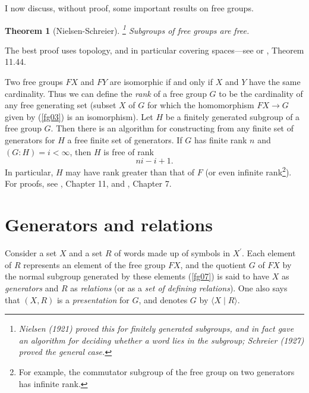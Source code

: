 \documentclass[a4paper,11pt,final,openany]{memoir}%
\newtheorem{theorem}[X]{Theorem}
\theoremstyle{nonumberplain}
\begin{document}
I now discuss, without proof, some important results on free groups.

\begin{theorem}
[Nielsen-Schreier]\label{fg06} \footnote{Nielsen (1921) proved this for
finitely generated subgroups, and in fact gave an algorithm for deciding
whether a word lies in the subgroup; Schreier (1927) proved the general
case.}
%
Subgroups of free groups are free.
\end{theorem}

The best proof uses topology, and in particular covering spaces---see
\cite{serre1980} or \cite{rotman1995}, Theorem 11.44.

Two free groups $FX$ and $FY$ are isomorphic if and only if $X$ and $Y$ have
the same cardinality. Thus we can define the \emph{rank}%
%
\emph{\/} of a free group $G$ to be the cardinality of any free generating set
(subset $X$ of $G$ for which the homomorphism $FX\rightarrow G$ given by
(\ref{fg03}) is an isomorphism). Let $H$ be a finitely generated subgroup of a
free group $G$. Then there is an algorithm for constructing from any finite
set of generators for $H$ a free finite set of generators. If $G$ has finite
rank $n$ and $(G:H)=i<\infty$, then $H$ is free of rank
\[
ni-i+1.
\]
In particular, $H$ may have rank greater than that of $F$ (or even infinite
rank\footnote{For example, the commutator subgroup of the free group on two
generators has infinite rank.}). For proofs, see \cite{rotman1995}, Chapter
11, and \cite{hall1959}, Chapter 7.

\section{Generators and relations}

Consider a set $X$ and a set $R$ of words made up of symbols in $X^{\prime}$.
Each element of $R$ represents an element of the free group $FX$, and the
quotient $G$ of $FX$ by the normal subgroup generated by these elements
(\ref{fg07}) is said to have $X$ as \emph{generators\/}%
and $R$ as \emph{relations }(or as a \emph{set of defining relations}).%
%
One also says that $(X,R)$ is a \emph{presentation\/}%
for $G$, and denotes $G$ by $\langle X\mid R\rangle$.
\end{document}
